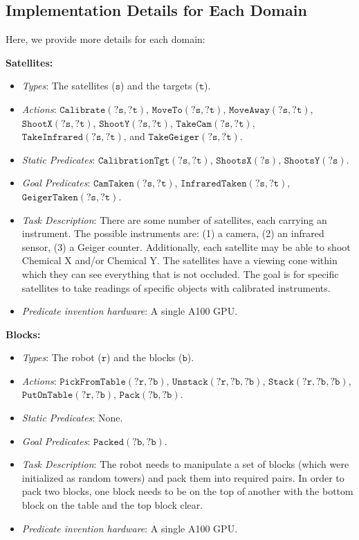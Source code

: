 \subsection{Implementation Details for Each Domain}\label{app:domain_details}

Here, we provide more details for each domain:

\textbf{Satellites:}
\begin{itemize}
    \item \textit{Types}: The satellites ($\mathtt{s}$) and the targets ($\mathtt{t}$). 
    \item \textit{Actions}: $\mathtt{Calibrate(?s,?t)}$, $\mathtt{MoveTo(?s,?t)}$, $\mathtt{MoveAway(?s,?t)}$, $\mathtt{ShootX(?s,?t)}$, $\mathtt{ShootY(?s,?t)}$, $\mathtt{TakeCam(?s,?t)}$, $\mathtt{TakeInfrared(?s,?t)}$, and $\mathtt{TakeGeiger(?s,?t)}$.
    \item \textit{Static Predicates}: $\mathtt{CalibrationTgt(?s,?t)}$, $\mathtt{ShootsX(?s)}$, $\mathtt{ShootsY(?s)}$.
    \item \textit{Goal Predicates}: $\mathtt{CamTaken(?s,?t)}$, $\mathtt{InfraredTaken(?s,?t)}$, $\mathtt{GeigerTaken(?s,?t)}$.
    \item \textit{Task Description}: There are some number of satellites, each carrying an instrument. The possible instruments are: (1) a camera, (2) an infrared sensor, (3) a Geiger counter.
    Additionally, each satellite may be able to shoot Chemical X and/or Chemical
    Y. The satellites have a viewing cone within which they can see everything
    that is not occluded. The goal is for specific satellites to take readings
    of specific objects with calibrated instruments.
    \item \textit{Predicate invention hardware}: A single A100 GPU.
\end{itemize}

\textbf{Blocks:}
\begin{itemize}
    \item \textit{Types}: The robot ($\mathtt{r}$) and the blocks ($\mathtt{b}$). 
    \item \textit{Actions}: $\mathtt{PickFromTable(?r,?b)}$, $\mathtt{Unstack(?r,?b,?b)}$, $\mathtt{Stack(?r,?b,?b)}$, $\mathtt{PutOnTable(?r,?b)}$, $\mathtt{Pack(?b,?b)}$.
    \item \textit{Static Predicates}: None.
    \item \textit{Goal Predicates}: $\mathtt{Packed(?b,?b)}$.
    \item \textit{Task Description}: The robot needs to manipulate a set of blocks (which were initialized as random towers) and pack them into required pairs. In order to pack two blocks, one block needs to be on the top of another with the bottom block on the table and the top block clear.
    \item \textit{Predicate invention hardware}: A single A100 GPU.
\end{itemize}

